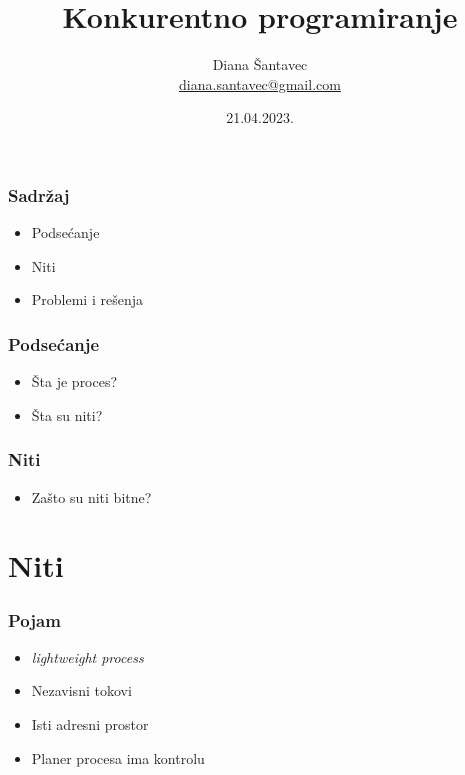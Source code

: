 \documentclass{beamer}
\title{Konkurentno programiranje}
\author[Diana Šantavec]{Diana Šantavec \\ \small \url{diana.santavec@gmail.com}}
\institute{Istraživačka stanica Petnica}
\date{21.04.2023.}
\begin{document}
\frame{\titlepage}

\begin{frame}
    \frametitle{Sadržaj}
    \begin{itemize}
        \item Podsećanje \newline
        \item Niti \newline
        \item Problemi i rešenja \newline
    \end{itemize}
\end{frame}

\begin{frame}
    \frametitle{Podsećanje}
    \begin{itemize}
        \item Šta je proces? \newline
        \item Šta su niti? \newline 
    \end{itemize}
\end{frame}

\begin{frame}
    \frametitle{Niti}
    \begin{itemize}
        \item Zašto su niti bitne?
    \end{itemize}
\end{frame}

\section*{Niti}
\begin{frame}
    \frametitle{Pojam}
    \begin{itemize}
        \item \textit{lightweight process} \newline
        \item Nezavisni tokovi \newline
        \item Isti adresni prostor \newline
        \item Planer procesa ima kontrolu
    \end{itemize}

\end{frame}
\end{document}
